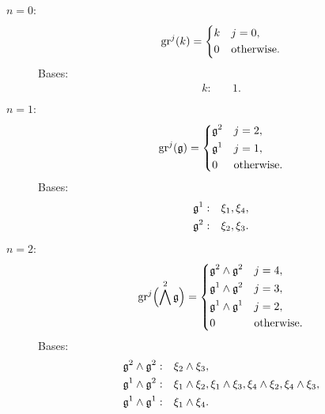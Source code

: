 \begin{description}
  \item[$n=0:$]
        \begin{equation*}
          \operatorname{gr}^{j}(k) =
          \begin{dcases}
            k & j=0, \\
            0 & \text{otherwise.}
          \end{dcases}
        \end{equation*}
        Bases:
        \begin{align*}
          k: \quad & 1.
        \end{align*}

   \item[$n=1:$]
        \begin{equation*}
          \operatorname{gr}^{j}(\mathfrak{g}) =
          \begin{dcases}
            \mathfrak{g}^{2} & j=2, \\
            \mathfrak{g}^{1} & j=1, \\
            0          & \text{otherwise.}
          \end{dcases}
        \end{equation*}
        Bases:
        \begin{align*}
          \mathfrak{g}^{1}: \quad & \xi_{1}, \xi_{4}, \\
          \mathfrak{g}^{2}: \quad & \xi_{2}, \xi_{3}.
        \end{align*}

   \item[$n=2:$]
        \begin{equation*}
          \operatorname{gr}^{j}\Bigl( \bigwedge^{2}\mathfrak{g} \Bigr) =
          \begin{dcases}
            \mathfrak{g}^{2} \wedge \mathfrak{g}^{2} & j=4, \\
            \mathfrak{g}^{1} \wedge \mathfrak{g}^{2} & j=3, \\
            \mathfrak{g}^{1} \wedge \mathfrak{g}^{1} & j=2, \\
            0                             & \text{otherwise.}
          \end{dcases}
        \end{equation*}
        Bases:
        \begin{align*}
          \mathfrak{g}^{2} \wedge \mathfrak{g}^{2}: \quad & \xi_{2} \wedge \xi_{3}, \\
          \mathfrak{g}^{1} \wedge \mathfrak{g}^{2}: \quad & \xi_{1} \wedge \xi_{2}, \xi_{1} \wedge \xi_{3}, \xi_{4} \wedge \xi_{2}, \xi_{4} \wedge \xi_{3}, \\
          \mathfrak{g}^{1} \wedge \mathfrak{g}^{1}: \quad & \xi_{1} \wedge \xi_{4}.
        \end{align*}


\end{description}
